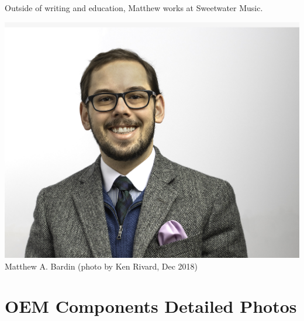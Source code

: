 Outside of writing and education, Matthew works at Sweetwater Music. %


   \begin{center}
   \vspace{5mm}
       \includegraphics[scale=0.5]{Matt Bardin_web_head_4370.jpg}\\
        Matthew A. Bardin (photo by Ken Rivard, Dec 2018)
   \end{center}








\section{OEM Components Detailed Photos}




